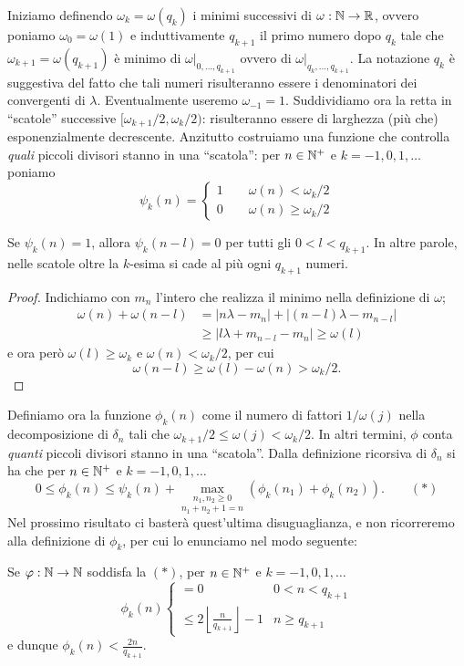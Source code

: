 Iniziamo definendo $\omega_k=\omega(q_k)$ i minimi successivi di $\omega:\mathbb{N}\rightarrow\mathbb{R}$, ovvero poniamo $\omega_0=\omega(1)$ e induttivamente $q_{k+1}$ il primo numero dopo $q_k$ tale che $\omega_{k+1}=\omega(q_{k+1})$ è minimo di $\omega|_{0,\dots,q_{k+1}}$ ovvero di $\omega|_{q_k,\dots,q_{k+1}}$. La notazione $q_k$ è suggestiva del fatto che tali numeri risulteranno essere i denominatori dei convergenti di $\lambda$. Eventualmente useremo $\omega_{-1}=1$. \newline
Suddividiamo ora la retta in ``scatole'' successive $[\omega_{k+1}/2,\omega_k/2)$: risulteranno essere di larghezza (più che) esponenzialmente decrescente. Anzitutto costruiamo una funzione che controlla \emph{quali} piccoli divisori stanno in una ``scatola'': per $n\in\mathbb{N}^+$ e $k=-1,0,1,\dots$ poniamo
\[\psi_k(n)=\begin{cases}
   1 \qquad \omega(n)<\omega_k/2\\
   0 \qquad \omega(n)\geq \omega_k/2
  \end{cases}\]
\begin{lemma} Se $\psi_k(n)=1$, allora $\psi_k(n-l)=0$ per tutti gli $0<l<q_{k+1}$. In altre parole, nelle scatole oltre la $k$-esima si cade al più ogni $q_{k+1}$ numeri.\end{lemma}
\begin{proof}
 Indichiamo con $m_n$ l'intero che realizza il minimo nella definizione di $\omega$;
 \[\begin{split}
  \omega(n)+\omega(n-l) &=|n\lambda-m_n|+|(n-l)\lambda-m_{n-l}|\\
			&\geq |l\lambda+m_{n-l}-m_n|\geq \omega(l)
\end{split}\]
e ora però $\omega(l)\geq \omega_k$ e $\omega(n)<\omega_k/2$, per cui
\[\omega(n-l)\geq \omega(l)-\omega(n)>\omega_k/2.\] 
\end{proof}

Definiamo ora la funzione $\phi_k(n)$ come il numero di fattori $1/\omega(j)$ nella decomposizione di $\delta_n$ tali che $\omega_{k+1}/2\leq\omega(j)<\omega_k/2$. In altri termini, $\phi$ conta \emph{quanti} piccoli divisori stanno in una ``scatola''. Dalla definizione ricorsiva di $\delta_n$ si ha che per $n\in\mathbb{N}^+$ e $k=-1,0,1,\dots$
\[0\leq \phi_k(n)\leq\psi_k(n)+\underset{n_1+n_2+1=n}{\max_{n_1,n_2\geq 0}}(\phi_k(n_1)+\phi_k(n_2)).\qquad (*)\]
Nel prossimo risultato ci basterà quest'ultima disuguaglianza, e non ricorreremo alla definizione di $\phi_k$, per cui lo enunciamo nel modo seguente:

\begin{lemma} Se $\varphi:\mathbb{N}\rightarrow\mathbb{N}$ soddisfa la $(*)$, per $n\in\mathbb{N}^+$ e $k=-1,0,1,\dots$
 \[\phi_k(n)\begin{cases} =0 & 0<n<q_{k+1}\\
    \leq 2\left\lfloor\frac{n}{q_{k+1}}\right\rfloor-1 & n\geq q_{k+1}
   \end{cases}\]
   e dunque $\phi_k(n)<\frac{2n}{q_{k+1}}$.
   \end{lemma}
 
